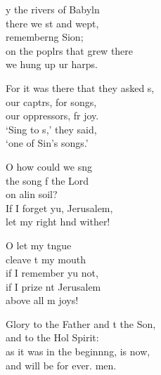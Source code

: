 \settowidth{\versewidth}{For it was there that they asked us, +}
\begin{psalmverse}%
  \begin{patverse}
y the rivers of Babyln\Flex\\
    there we st and wept,\Med\\
    remember\pointup{\i}ng Sion;\\
on the poplrs that grew there\Med\\
    we hung up ur harps.

For it was there that they asked s,\Flex\\
    our captrs, for songs,\Med\\
    our oppressors, fr joy.\\
‘Sing to s,’ they said,\Med\\
    ‘one of Sin’s songs.’

O how could we s\pointup{\i}ng\Flex\\
    the song f the Lord\Med\\
    on alin soil?\\
If I forget yu, Jerusalem,\Med\\
    let my right hnd wither!

O let my tngue\Flex\\
    cleave t my mouth\Med\\
    if I remember yu not,\\
if I prize nt Jerusalem\Med\\
    above all m joys!

Glory to the Father and t the Son,\Med\\
    and to the Hol Spirit:\\
as it was in the beginn\pointup{\i}ng, is now,\Med\\
    and will be for ever. men.
  \end{patverse}
\end{psalmverse}
